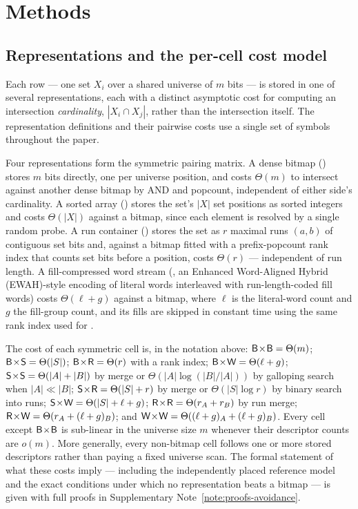 \section*{Methods}

\subsection*{Representations and the per-cell cost model}

Each row --- one set $X_i$ over a shared universe of $m$ bits --- is stored in one of several
representations, each with a distinct asymptotic cost for computing an intersection
\emph{cardinality}, $|X_i \cap X_j|$, rather than the intersection itself. The representation
definitions and their pairwise costs use a single set of symbols throughout the paper.

Four representations form the symmetric pairing matrix. A dense bitmap (\rB) stores $m$ bits directly,
one per universe position, and costs $\Theta(m)$ to intersect against another dense bitmap by AND and
popcount, independent of either side's cardinality. A sorted array (\rS) stores the set's
$|X|$ set positions as sorted integers and costs $\Theta(|X|)$ against a bitmap, since each element is
resolved by a single random probe. A run container (\rR) stores the set as $r$ maximal runs
$(a,b)$ of contiguous set bits and, against a bitmap fitted with a prefix-popcount rank index that
counts set bits before a position, costs
$\Theta(r)$ --- independent of run length. A fill-compressed word stream (\rW, an Enhanced
Word-Aligned Hybrid (EWAH)-style
encoding of literal words interleaved with run-length-coded fill words) costs
$\Theta(\ell + g)$ against a bitmap, where $\ell$ is the literal-word count and $g$ the fill-group
count, and its fills are skipped in constant time using the same rank index used for \rR.

The cost of each symmetric cell is, in the notation above: $\textsf{B}\!\times\!\textsf{B}=\Theta(m)$;
$\textsf{B}\!\times\!\textsf{S}=\Theta(|S|)$; $\textsf{B}\!\times\!\textsf{R}=\Theta(r)$
with a rank index; $\textsf{B}\!\times\!\textsf{W}=\Theta(\ell+g)$; $\textsf{S}\!\times\!\textsf{S}=\Theta(|A|+|B|)$ by merge or
$\Theta(|A|\log(|B|/|A|))$ by galloping search when $|A|\ll|B|$; $\textsf{S}\!\times\!\textsf{R}=\Theta(|S|+r)$ by
merge or $\Theta(|S|\log r)$ by binary search into runs; $\textsf{S}\!\times\!\textsf{W}=\Theta(|S|+\ell+g)$;
$\textsf{R}\!\times\!\textsf{R}=\Theta(r_A+r_B)$ by run merge; $\textsf{R}\!\times\!\textsf{W}=\Theta(r_A+(\ell+g)_B)$; and
$\textsf{W}\!\times\!\textsf{W}=\Theta((\ell+g)_A+(\ell+g)_B)$. Every cell except $\textsf{B}\!\times\!\textsf{B}$ is sub-linear in
the universe size $m$ whenever their descriptor counts are $o(m)$. More generally, every non-bitmap
cell follows one or more stored descriptors rather than paying a fixed universe scan. The formal
statement of what these costs imply --- including the independently placed reference model and the
exact conditions under which no representation beats a bitmap
--- is given with full proofs in Supplementary Note~\ref{note:proofs-avoidance}.

